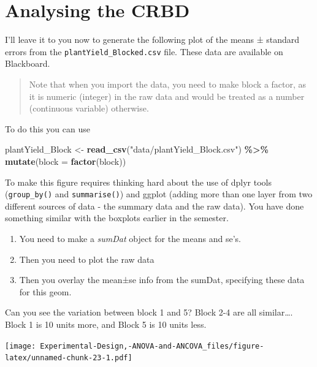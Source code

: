 \documentclass[
]{book}
\newenvironment{Shaded}{\begin{snugshade}}{\end{snugshade}}
\newcommand{\AttributeTok}[1]{\textcolor[rgb]{0.13,0.29,0.53}{#1}}
\newcommand{\FunctionTok}[1]{\textcolor[rgb]{0.13,0.29,0.53}{\textbf{#1}}}
\newcommand{\NormalTok}[1]{#1}
\newcommand{\OtherTok}[1]{\textcolor[rgb]{0.56,0.35,0.01}{#1}}
\newcommand{\SpecialCharTok}[1]{\textcolor[rgb]{0.81,0.36,0.00}{\textbf{#1}}}
\newcommand{\StringTok}[1]{\textcolor[rgb]{0.31,0.60,0.02}{#1}}
\providecommand{\tightlist}{%
  \setlength{\itemsep}{0pt}\setlength{\parskip}{0pt}}
\begin{document}
\hypertarget{analysing-the-crbd}{%
\section{Analysing the CRBD}\label{analysing-the-crbd}}

I'll leave it to you now to generate the following plot of the means ± standard errors from the \texttt{plantYield\_Blocked.csv} file. These data are available on Blackboard.

\begin{quote}
Note that when you import the data, you need to make block a factor, as it is numeric (integer) in the raw data and would be treated as a number (continuous variable) otherwise.
\end{quote}

To do this you can use

\begin{Shaded}
\begin{Highlighting}[]
\NormalTok{plantYield\_Block }\OtherTok{\textless{}{-}} \FunctionTok{read\_csv}\NormalTok{(}\StringTok{"data/plantYield\_Block.csv"}\NormalTok{) }\SpecialCharTok{\%\textgreater{}\%} 
  \FunctionTok{mutate}\NormalTok{(}\AttributeTok{block =} \FunctionTok{factor}\NormalTok{(block))}
\end{Highlighting}
\end{Shaded}

To make this figure requires thinking hard about the use of dplyr tools (\texttt{group\_by()} and \texttt{summarise()}) and ggplot (adding more than one layer from two different sources of data - the summary data and the raw data). You have done something similar with the boxplots earlier in the semester.

\begin{enumerate}
\def\labelenumi{\arabic{enumi}.}
\tightlist
\item
  You need to make a \emph{sumDat} object for the means and se's.\\
\item
  Then you need to plot the raw data
\item
  Then you overlay the mean±se info from the sumDat, specifying these data for this geom.
\end{enumerate}

Can you see the variation between block 1 and 5? Block 2-4 are all similar\ldots. Block 1 is 10 units more, and Block 5 is 10 units less.

\texttt{[image: Experimental-Design,-ANOVA-and-ANCOVA\_files/figure-latex/unnamed-chunk-23-1.pdf]}
\end{document}
